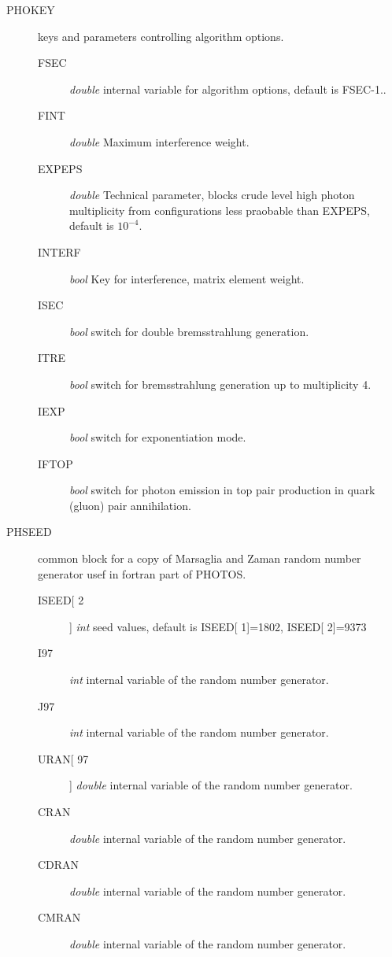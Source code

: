 \documentclass[]{Photos_interface_design}
\begin{document}
\begin{description}
\item[PHOKEY] keys and parameters controlling algorithm options.
    \begin{description}
	\item[FSEC]   \textit{double} internal variable for algorithm options, default is FSEC-1..
	\item[FINT]   \textit{double} Maximum interference weight.
	\item[EXPEPS] \textit{double} Technical parameter, blocks crude level high photon multiplicity from configurations less praobable than EXPEPS, default is $10^{-4}$.
	\item[INTERF] \textit{bool} Key for interference, matrix element weight.
	\item[ISEC]   \textit{bool} switch for double bremsstrahlung generation.
	\item[ITRE]   \textit{bool} switch for bremsstrahlung generation up to multiplicity 4.
	\item[IEXP]   \textit{bool} switch for exponentiation mode.
	\item[IFTOP]  \textit{bool} switch for photon emission in top pair production in quark (gluon) pair annihilation.
    \end{description}
\end{description}

\begin{description}
\item[PHSEED] common block for a copy of Marsaglia and Zaman random number generator usef in fortran part of PHOTOS.
    \begin{description}
	\item[ISEED[ 2]]  \textit{int} seed values, default is  ISEED[ 1]=1802, ISEED[ 2]=9373
	\item[I97]        \textit{int} internal variable of the random number generator.
	\item[J97]        \textit{int} internal variable of the random number generator.
	\item[URAN[ 97]]  \textit{double} internal variable of the random number generator.
	\item[CRAN]       \textit{double} internal variable of the random number generator.
	\item[CDRAN]      \textit{double} internal variable of the random number generator.
	\item[CMRAN]      \textit{double} internal variable of the random number generator.
    \end{description}
\end{description}
\end{document}
